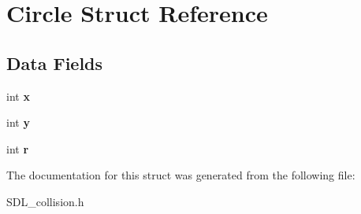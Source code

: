 \hypertarget{structCircle}{}\section{Circle Struct Reference}
\label{structCircle}
\subsection*{Data Fields}
\begin{DoxyCompactItemize}
\item 
\mbox{\label{structCircle_abceecd15b990054ddc30441cfcbb205d}} 
int {\bfseries x}
\item 
\mbox{\label{structCircle_a78aef28b3c176d14e8d25f8cd84e7dfd}} 
int {\bfseries y}
\item 
\mbox{\label{structCircle_a067c0b8ccbda5ca1f518dd89a1d55989}} 
int {\bfseries r}
\end{DoxyCompactItemize}


The documentation for this struct was generated from the following file\+:\begin{DoxyCompactItemize}
\item 
S\+D\+L\+\_\+collision.\+h\end{DoxyCompactItemize}
